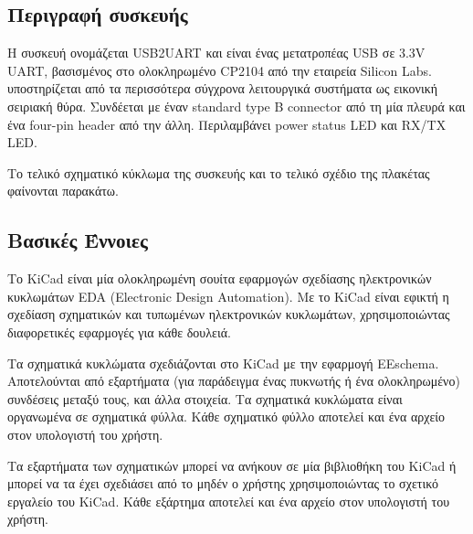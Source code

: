\documentclass[a4paper]{article}
\begin{document}
\subsection{Περιγραφή συσκευής}
Η συσκευή ονομάζεται USB2UART και είναι ένας μετατροπέας USB σε 3.3V UART, βασισμένος στο ολοκληρωμένο CP2104 από την εταιρεία Silicon Labs. υποστηρίζεται από τα περισσότερα σύγχρονα λειτουργικά συστήματα ως εικονική σειριακή θύρα. Συνδέεται με έναν standard type B connector από τη μία πλευρά και ένα four-pin header από την άλλη. Περιλαμβάνει power status LED και RX/TX LED.

Το τελικό σχηματικό κύκλωμα της συσκευής και το τελικό σχέδιο της πλακέτας φαίνονται παρακάτω.

\begin{figure}
  \begin{center}
    \label{fig:kicad-main}
  \end{center}
\end{figure}

\begin{figure}
  \begin{center}
    \label{fig:kicad-main}
  \end{center}
\end{figure}

\subsection{Βασικές Έννοιες}
Το KiCad είναι μία ολοκληρωμένη σουίτα εφαρμογών σχεδίασης ηλεκτρονικών κυκλωμάτων EDA (Electronic Design Automation). Με το KiCad είναι εφικτή η σχεδίαση σχηματικών και τυπωμένων ηλεκτρονικών κυκλωμάτων, χρησιμοποιώντας διαφορετικές εφαρμογές για κάθε δουλειά.

Τα σχηματικά κυκλώματα σχεδιάζονται στο KiCad με την εφαρμογή EEschema. Αποτελούνται από εξαρτήματα (για παράδειγμα ένας πυκνωτής ή ένα ολοκληρωμένο) συνδέσεις μεταξύ τους, και άλλα στοιχεία. Τα σχηματικά κυκλώματα είναι οργανωμένα σε σχηματικά φύλλα. Κάθε σχηματικό φύλλο αποτελεί και ένα αρχείο στον υπολογιστή του χρήστη.

Τα εξαρτήματα των σχηματικών μπορεί να ανήκουν σε μία βιβλιοθήκη του KiCad ή μπορεί να τα έχει σχεδιάσει από το μηδέν ο χρήστης χρησιμοποιώντας το σχετικό εργαλείο του KiCad. Κάθε εξάρτημα αποτελεί και ένα αρχείο στον υπολογιστή του χρήστη.
\end{document}
